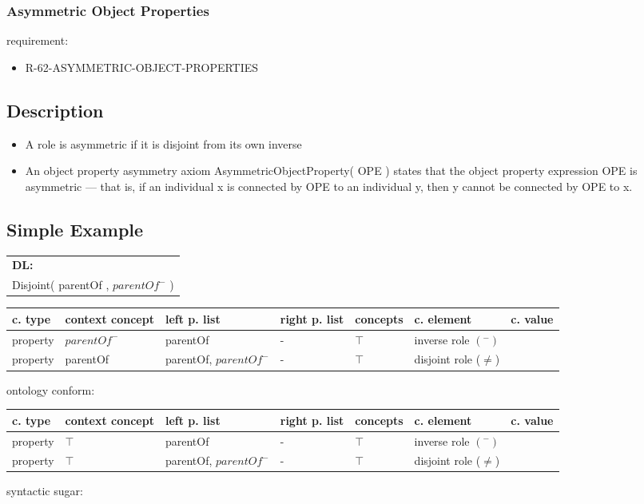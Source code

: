 \documentclass{llncs}
\newenvironment{gcotable}{
  \scriptsize
  \sffamily
  \vspace{0.3cm}
  \begin{tabular}{l|l|l|l|l|l|l}
  \hline
  \textbf{c. type} & \textbf{context concept} & \textbf{left p. list} & \textbf{right p. list} & \textbf{concepts} & \textbf{c. element} & \textbf{c. value} \\
  \hline

}{
  \hline
  \end{tabular}
  \linebreak
}
\newenvironment{DL}{
  \scriptsize
  \sffamily
  \vspace{0.3cm}
  \begin{tabular}{l}
	\textbf{DL:} \\

}{
  \end{tabular}
  \linebreak
}
\begin{document}
\subsubsection{Asymmetric Object Properties}

requirement:

\begin{itemize}
	\item R-62-ASYMMETRIC-OBJECT-PROPERTIES
\end{itemize}

\subsection{Description}

\begin{itemize}
	\item A role is asymmetric if it is disjoint from its own inverse \cite{Kroetzsch2012}
	\item An object property asymmetry axiom AsymmetricObjectProperty( OPE ) states that the object property expression OPE is asymmetric — that is, if an individual x is connected by OPE to an individual y, then y cannot be connected by OPE to x. 
\end{itemize}

\subsection{Simple Example}

\begin{DL}
Disjoint( parentOf , $parentOf^{-}$ )
\end{DL}

\begin{gcotable}
property & $parentOf^{-}$ & parentOf & - & $\top$ & inverse role $(^{-})$ \\
property & parentOf & parentOf, $parentOf^{-}$ & - & $\top$ & disjoint role ($\ne$) \\
\end{gcotable}

ontology conform:

\begin{gcotable}
property & $\top$ & parentOf & - & $\top$ & inverse role $(^{-})$ \\
property & $\top$ & parentOf, $parentOf^{-}$ & - & $\top$ & disjoint role ($\ne$) \\
\end{gcotable}

syntactic sugar:
\end{document}
